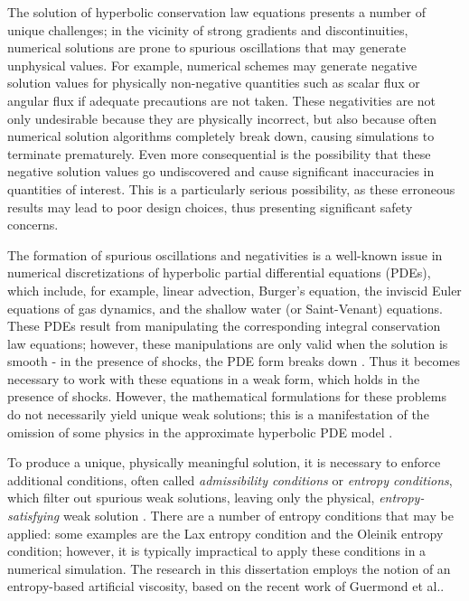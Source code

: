 The solution of hyperbolic conservation law equations
presents a number of unique challenges; in the vicinity of strong
gradients and discontinuities, numerical solutions are prone to spurious
oscillations that may generate unphysical values. For example,
numerical schemes may generate negative solution values for physically
non-negative quantities such as scalar flux or angular flux
if adequate precautions are not taken.
These negativities are not only undesirable because they are physically
incorrect, but also because often numerical solution algorithms completely break
down, causing simulations to terminate prematurely. Even more consequential
is the possibility that these negative solution values go undiscovered
and cause significant inaccuracies in quantities of interest.
This is a particularly serious possibility, as these erroneous results may
lead to poor design choices, thus presenting significant safety concerns.

The formation of spurious oscillations and negativities is a well-known issue
in numerical discretizations of hyperbolic partial differential equations (PDEs), which
include, for example, linear advection, Burger's equation, the inviscid Euler
equations of gas dynamics, and the shallow water (or Saint-Venant) equations.
These PDEs result from manipulating the corresponding integral conservation law
equations; however, these manipulations are only valid when the solution is
smooth - in the presence of shocks, the PDE form breaks down
\cite{leveque2002}. Thus it becomes necessary to work with these
equations in a weak form, which holds in the presence of shocks.  However, the
mathematical formulations for these problems do not necessarily yield unique
weak solutions; this is a manifestation of the omission of some physics in the
approximate hyperbolic PDE model \cite{leveque2002}.

To produce a unique, physically meaningful solution, it is necessary to
enforce additional conditions, often called \emph{admissibility conditions}
or \emph{entropy conditions}, which filter out spurious weak solutions,
leaving only the physical, \emph{entropy-satisfying} weak solution
\cite{leveque2002}.
There are a number of entropy conditions that may be applied: some
examples are the Lax entropy condition and the Oleinik entropy
condition\cite{leveque2002}; however, it is typically impractical
to apply these conditions in a numerical simulation. The research in this
dissertation employs the notion of an entropy-based artificial viscosity,
based on the recent work of Guermond et al.\cite{guermond_ev}.

